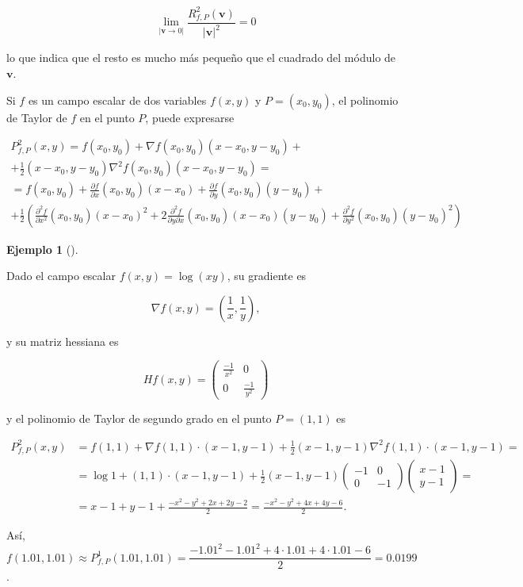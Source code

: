 \documentclass[
  a4paper,
]{scrreport}
\theoremstyle{plain}
\theoremstyle{plain}
\theoremstyle{definition}
\theoremstyle{definition}
\newtheorem{example}{Ejemplo}[chapter]
\theoremstyle{plain}
\theoremstyle{definition}
\theoremstyle{remark}
\begin{document}
\[\lim_{|\mathbf{v}\rightarrow 0|} \frac{R^2_{f,P}(\mathbf{v})}{|\mathbf{v}|^2} = 0\]

lo que indica que el resto es mucho más pequeño que el cuadrado del
módulo de \(\mathbf{v}\).

Si \(f\) es un campo escalar de dos variables \(f(x,y)\) y
\(P=(x_0,y_0)\), el polinomio de Taylor de \(f\) en el punto \(P\),
puede expresarse

\[
\begin{gathered}
P^2_{f,P}(x,y) = f(x_0,y_0)+\nabla f(x_0,y_0)(x-x_0,y-y_0) +\\
+\frac{1}{2}(x-x_0,y-y_0)\nabla^2f(x_0,y_0)(x-x_0,y-y_0)= \\
= f(x_0,y_0)+\frac{\partial f}{\partial x}(x_0,y_0)(x-x_0)+\frac{\partial f}{\partial y}(x_0,y_0)(y-y_0)+\\
+\frac{1}{2}\left(\frac{\partial^2 f}{\partial x^2}(x_0,y_0) (x-x_0)^2 + 2\frac{\partial^2 f}{\partial y\partial x}(x_0,y_0) (x-x_0)(y-y_0) + \frac{\partial^2 f}{\partial y^2}(x_0,y_0) (y-y_0)^2\right)
\end{gathered}
\]

\begin{example}[]\protect\hypertarget{exm-polinomio-taylor-funcion-varias-variables}{}\label{exm-polinomio-taylor-funcion-varias-variables}

Dado el campo escalar \(f(x,y)=\log(xy)\), su gradiente es

\[\nabla f(x,y) = \left(\frac{1}{x},\frac{1}{y}\right),\]

y su matriz hessiana es

\[Hf(x,y) = \left(
\begin{array}{cc}
\frac{-1}{x^2} & 0\\
0 & \frac{-1}{y^2}
\end{array}
\right)\]

y el polinomio de Taylor de segundo grado en el punto \(P=(1,1)\) es

\[
\begin{aligned}
P^2_{f,P}(x,y) &= f(1,1) +\nabla f(1,1)\cdot (x-1,y-1) + \frac{1}{2}(x-1,y-1)\nabla^2f(1,1)\cdot(x-1,y-1)=\\
&= \log 1+(1,1)\cdot(x-1,y-1) + \frac{1}{2}(x-1,y-1)
\left(
\begin{array}{cc}
-1 & 0\\
0 & -1
\end{array}
\right)
\left(
\begin{array}{c}
x-1\\
y-1
\end{array}
\right)
= \\
&= x-1+y-1+\frac{-x^2-y^2+2x+2y-2}{2} = \frac{-x^2-y^2+4x+4y-6}{2}.
\end{aligned}
\]

Así,
\[f(1.01,1.01) \approx P^1_{f,P}(1.01,1.01) = \frac{-1.01^2-1.01^2+4\cdot 1.01+4\cdot 1.01-6}{2} = 0.0199\].

\end{example}
\end{document}
